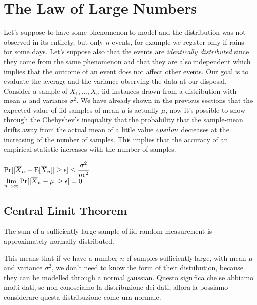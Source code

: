 \section{The Law of Large Numbers}
Let's suppose to have some phenomenon to model and the distribution was not observed in its entirety, but only $n$ events, for example we register only if rains for some days. Let's suppose also that the events are \textit{identically distributed} since they come from the same phenomenon and that they are also independent which implies that the outcome of an event does not affect other events. \newline
Our goal is to evaluate the average and the variance observing the data at our disposal. \newline
Consider a sample of $X_1, \hdots, X_n$ iid instances drawn from a distribution with mean $\mu$ and variance $\sigma^2$. \newline
We have already shown in the previous sections that the expected value of iid samples of mean $\mu$ is actually $\mu$, now it's possible to show through the Chebyshev's inequality that the probability that the sample-mean drifts away from the actual mean of a little value $\\epsilon$ decreases at the increasing of the number of samples. This implies that the accuracy of an empirical statistic increases with the number of samples.
\begin{center}
	$\displaystyle \text{Pr}[\vert \overline{X}_n-\text{E}[\overline{X}_n] \vert\geq\epsilon]\leq\frac{\sigma^2}{n\epsilon^2}$\\
	\vspace{0.3cm}
	$\displaystyle \lim_{n\rightarrow\infty} \text{Pr}[\vert \overline{X}_n-\mu \vert\geq \epsilon]=0$
\end{center}
%
%
%
\subsection{Central Limit Theorem}
\begin{definition}
The sum of a sufficiently large sample of iid random measurement is approximately normally distributed.
\end{definition}
This means that if we have a number $n$ of samples sufficiently large, with mean $\mu$ and variance $\sigma^2$, we don't need to know the form of their distribution, because they can be modelled through a normal gaussian. \newline
Questo significa che se abbiamo molti dati, se non conosciamo la distribuzione dei dati, allora la possiamo considerare questa distribuzione come una normale. \newline
%
%
%
